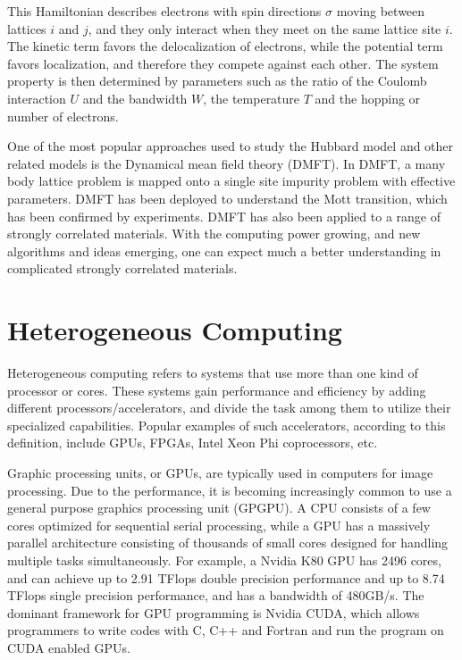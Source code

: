 This Hamiltonian describes electrons with spin directions $\sigma$ moving between 
lattices $i$ and $j$, and they only interact when they meet on the same lattice 
site $i$. The kinetic term favors the delocalization of electrons, while the 
potential term favors localization, and therefore they compete against each
other. The system property is then determined by parameters such as the ratio of
the Coulomb interaction $U$ and the bandwidth $W$, the temperature $T$ and the 
hopping or number of electrons. 

One of the most popular approaches used to study the Hubbard model and other related
models is the Dynamical mean field theory (DMFT). In DMFT, a many body lattice
problem is mapped onto a single site impurity problem with effective parameters.
DMFT has been deployed to understand the Mott transition, which has been confirmed
by experiments. DMFT has also been applied to a range of strongly correlated 
materials. With the computing power growing, and new algorithms and ideas emerging, 
one can expect much a better understanding in complicated strongly correlated 
materials.

\section{Heterogeneous Computing}
Heterogeneous computing refers to systems that use more than one kind of 
processor or cores. These systems gain performance and efficiency by adding
different processors/accelerators, and divide the task among them to utilize 
their specialized capabilities. 
Popular examples of such accelerators, according to this definition, include 
GPUs, FPGAs, Intel Xeon Phi coprocessors, etc.


Graphic processing units, or GPUs, are typically used in computers for image 
processing. 
Due to the performance, it is becoming increasingly common to use a general purpose 
graphics processing unit (GPGPU).
A CPU consists of a few cores optimized for sequential serial processing,
while a GPU has a massively parallel architecture 
consisting of thousands of small cores designed for handling multiple tasks 
simultaneously.
For example, a Nvidia K80 GPU has 2496 cores, and can achieve up to 2.91 TFlops 
double precision performance and up to 8.74 TFlops single precision performance, 
and has a bandwidth of 480GB/s.
The dominant framework for GPU programming is Nvidia CUDA, which allows 
programmers to write codes with C, C++ and Fortran and run the program on CUDA
enabled GPUs.


